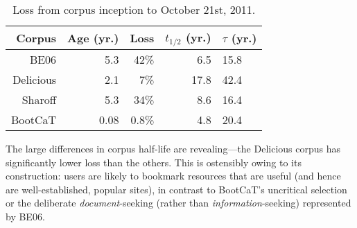 


\begin{table}[h*tb]
    \centering
    \begin{tabular}{|r | r | r | r | l|}
    \hline
	  Corpus & Age (yr.) & Loss & $t_{1/2}$ (yr.) & $\tau$ (yr.) \\
	\hline 
	
	BE06       & 5.3  & 42\%    & 6.5	& 15.8\\
	Delicious  & 2.1  & 7\%	    & 17.8 & 42.4\\
	Sharoff    & 5.3  & 34\%    & 8.6  & 16.4\\
	BootCaT    & 0.08 & 0.8\%   & 4.8  & 20.4\\
    \hline
    \end{tabular}

    \caption{Loss from corpus inception to October 21st, 2011.}
    \label{table:longitudinal:attrition-inputdist}
\end{table}

The large differences in corpus half-life are revealing---the Delicious corpus has significantly lower loss than the others.  This is ostensibly owing to its construction: users are likely to bookmark resources that are useful (and hence are well-established, popular sites), in contrast to BootCaT's uncritical selection or the deliberate \textsl{document}-seeking (rather than \textsl{information}-seeking) represented by BE06.


